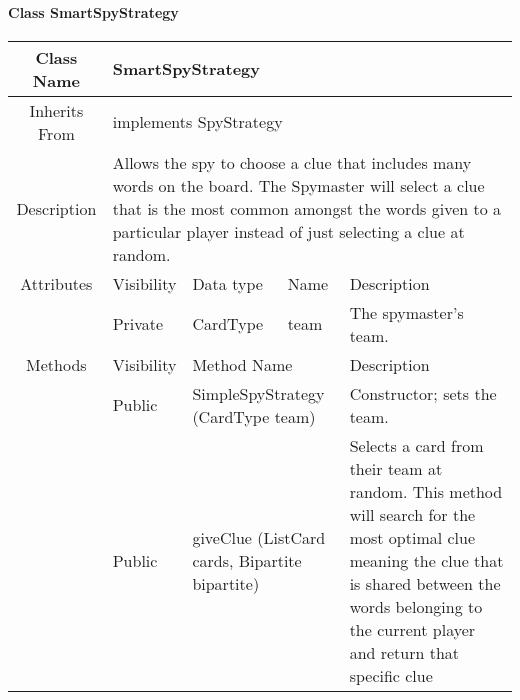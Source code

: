 \paragraph{Class SmartSpyStrategy}\mbox{}
\begin{tabularx}{\textwidth}{|c||l|l|l|X|}
    \hline
    \cellcolor{lightgray}Class Name & \multicolumn{4}{X|}{SmartSpyStrategy}\\
    \hline
    \cellcolor{lightgray}Inherits From & \multicolumn{4}{p{12cm}|}{implements SpyStrategy}\\
    \hline
    \cellcolor{lightgray}Description & \multicolumn{4}{p{12cm}|}{Allows the spy to choose a clue that includes many words on the board. The Spymaster will select a clue that is the most common amongst the words given to a particular player instead of just selecting a clue at random.}\\
    \hline\hline
    
    \cellcolor{lightgray}Attributes & \cellcolor{lightgray}Visibility & \cellcolor{lightgray}Data type & \cellcolor{lightgray}Name & \cellcolor{lightgray}Description\\\cline{2-5}
    \cellcolor{lightgray} & Private & CardType & team & The spymaster's team.\\
    \hline\hline
    
    \cellcolor{lightgray}Methods & \cellcolor{lightgray}Visibility & \multicolumn{2}{l|}{\cellcolor{lightgray}Method Name} & \cellcolor{lightgray}Description\\\cline{2-5}
    \cellcolor{lightgray} & Public & \multicolumn{2}{X|}{SimpleSpyStrategy (CardType team)} & Constructor; sets the team.\\\cline{2-5}
    \cellcolor{lightgray} & Public & \multicolumn{2}{X|}{giveClue (List\textlangle{}Card\textrangle{} cards, Bipartite bipartite)} & Selects a card from their team at random. This method will search for the most optimal clue meaning the clue that is shared between the words belonging to the current player and return that specific clue\\
    \hline
\end{tabularx}
